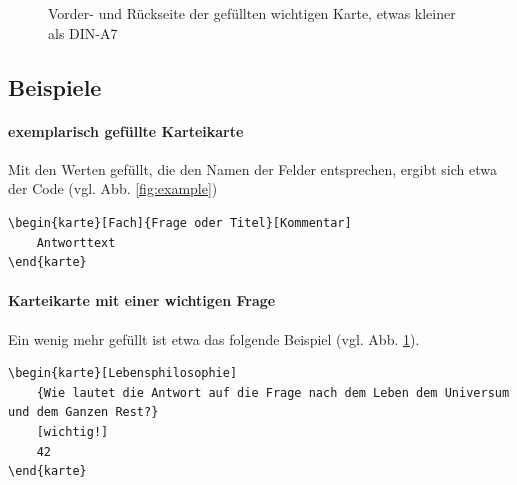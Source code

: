 \documentclass[a4paper,DIV=calc]{scrartcl}
\begin{document}
\begin{figure}
	\quad	{}
	\caption{Vorder- und Rückseite der gefüllten wichtigen Karte, etwas kleiner als DIN-A7}\label{fig:completeexample}
\end{figure}

\subsection{Beispiele}
\paragraph{exemplarisch gefüllte Karteikarte}
Mit den Werten gefüllt, die den Namen der Felder entsprechen, ergibt sich etwa der Code (vgl. Abb. \ref{fig:example})
	\begin{lstlisting}
\begin{karte}[Fach]{Frage oder Titel}[Kommentar]
	Antworttext
\end{karte}
	\end{lstlisting} 

\paragraph{Karteikarte mit einer wichtigen Frage}
	Ein wenig mehr gefüllt ist etwa das folgende Beispiel (vgl. Abb. \ref{fig:completeexample}).
	\begin{lstlisting}
\begin{karte}[Lebensphilosophie]
	{Wie lautet die Antwort auf die Frage nach dem Leben dem Universum und dem Ganzen Rest?}
	[wichtig!]
	42
\end{karte}		
	\end{lstlisting}	
\end{document}
